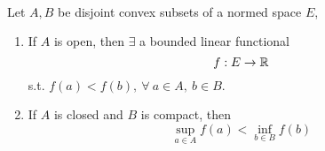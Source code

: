 \begin{theorem}\label{SepConvSets}\ \\
Let $A,B$ be disjoint convex subsets of a normed space $E$,
\begin{enumerate}[label = (\alph*)]
    \item If $A$ is open, then $\exists$ a bounded linear functional
    \begin{equation*}
        f: E \to \mathbb{R}
    \end{equation*}
    s.t. $f(a) < f(b),\ \forall\ a \in A,\ b \in B$.
    \item If $A$ is closed and $B$ is compact, then
    \begin{equation*}
        \sup_{a \in A} f(a) < \inf_{b \in B} f(b)
    \end{equation*}
\end{enumerate}
\end{theorem}
